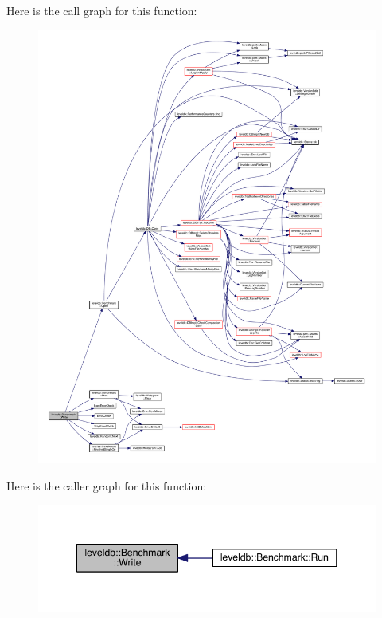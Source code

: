 Here is the call graph for this function\+:\nopagebreak
\begin{figure}[H]
\begin{center}
\leavevmode
\includegraphics[width=350pt]{classleveldb_1_1_benchmark_a86876b2882d9015610330e69acfdff0d_cgraph}
\end{center}
\end{figure}




Here is the caller graph for this function\+:\nopagebreak
\begin{figure}[H]
\begin{center}
\leavevmode
\includegraphics[width=348pt]{classleveldb_1_1_benchmark_a86876b2882d9015610330e69acfdff0d_icgraph}
\end{center}
\end{figure}


